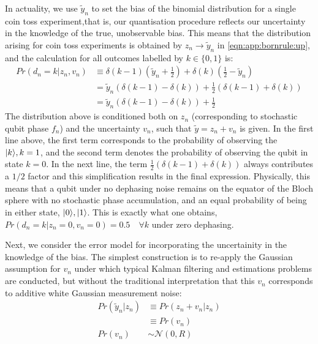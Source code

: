 In actuality, we use $\tilde{y}_n$ to set the bias of the binomial distribution for a single coin toss experiment,that is, our quantisation procedure reflects our uncertainty in the knowledge of the true, unobservable bias. This means that the distribution arising for coin toss experiments is obtained by $z_n \to \tilde{y}_n$ in \cref{eqn:app:bornrule:up}, and the calculation for all outcomes labelled by $k \in \{0, 1\}$ is:
\begin{align}
Pr(d_n=k | z_n, v_n) &\equiv  \delta(k-1) (\tilde{y}_n + \frac{1}{2})  +  \delta(k) ( \frac{1}{2} - \tilde{y}_n) \\
& =  \tilde{y}_n \left( \delta(k-1) - \delta(k) \right)  + \frac{1}{2}\left(\delta(k-1) + \delta(k) \right) \\
& = \tilde{y}_n \left( \delta(k-1) - \delta(k) \right)  + \frac{1}{2}
\end{align}
The distribution above is conditioned both on $z_n$ (corresponding to stochastic qubit phase $f_n$) and the uncertainty $v_n$, such that $\tilde{y} = z_n + v_n$ is given.  In the first line above, the first term corresponds to the probability of observing the $| k \rangle, k=1$, and the second term denotes the probability of observing the qubit in state $k=0$. In the next line, the term $\frac{1}{2}\left(\delta(k-1) + \delta(k) \right)$ always contributes a $1/2$ factor and this simplification results in the final expression. Physically, this means that a qubit under no dephasing noise remains on the equator of the Bloch sphere with no stochastic phase accumulation, and an equal probability of being in either state, $| 0 \rangle, | 1 \rangle$. This is exactly what one obtains, $Pr(d_n=k | z_n=0, v_n=0) = 0.5 \quad \forall k$ under zero dephasing. 

Next, we consider the error model for incorporating the uncertainity in the knowledge of the bias. The simplest construction is to re-apply the Gaussian assumption for $v_n$ under which typical Kalman filtering and estimations problems are conducted, but without the traditional interpretation that this $v_n$ corresponds to additive white Gaussian measurement noise:
\begin{align}
Pr( \tilde{y}_n | z_n) & \equiv Pr( z_n + v_n | z_n) \\
& \equiv Pr(v_n) \\
Pr(v_n)  & \sim \mathcal{N}(0, R)
\end{align}

